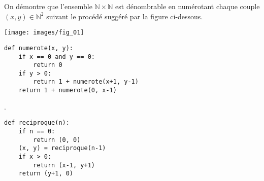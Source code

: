 



On démontre que l'ensemble $\mathbb{N}\times \mathbb{N}$ est dénombrable en numérotant chaque couple $(x,y)\in\mathbb{N}^2$ suivant le procédé suggéré par la figure ci-dessous.

\begin{center}
\texttt{[image: images/fig\_01]}
\end{center}

\ifprof
\begin{lstlisting}
def numerote(x, y):
    if x == 0 and y == 0:
        return 0
    if y > 0:
        return 1 + numerote(x+1, y-1)
    return 1 + numerote(0, x-1)
\end{lstlisting}
\else

\fi

.
\ifprof
\begin{lstlisting}
def reciproque(n):
    if n == 0:
        return (0, 0)
    (x, y) = reciproque(n-1)
    if x > 0:
        return (x-1, y+1)
    return (y+1, 0)
\end{lstlisting}
\else

\fi
